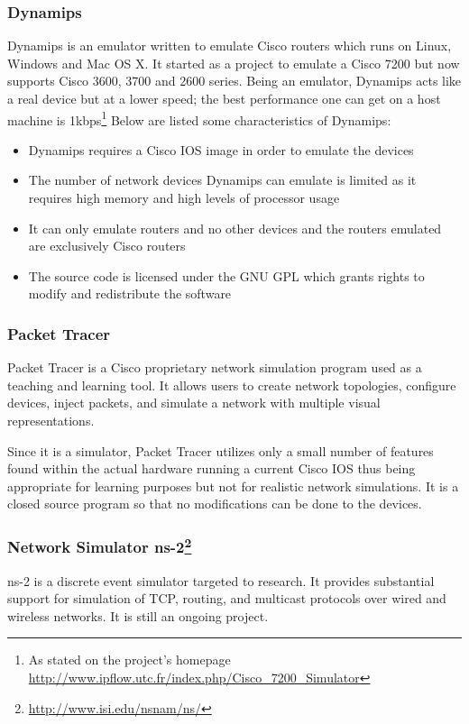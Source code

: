 \subsubsection{Dynamips}
Dynamips is an emulator written to emulate Cisco routers which runs on Linux, Windows and Mac OS X. It started as a project to emulate a Cisco 7200 but now supports  Cisco 3600, 3700 and 2600 series.
Being an emulator, Dynamips acts like a real device but at a lower speed; the best performance one can get on a host machine is 1kbps\footnote{As stated on the project's homepage \url{http://www.ipflow.utc.fr/index.php/Cisco_7200_Simulator}}
Below are listed some characteristics of Dynamips:
\begin{itemize}
\item Dynamips requires a Cisco IOS image in order to emulate the devices 
\item The number of network devices Dynamips can emulate is limited as it requires high memory and high levels of  processor usage
\item It can only emulate routers and no other devices and the routers emulated are exclusively Cisco routers
\item The source code is licensed under the GNU GPL which grants rights to modify and redistribute the software
\end{itemize}

\subsubsection{Packet Tracer}
Packet Tracer is a Cisco proprietary network simulation program used as a teaching and learning tool. It allows users to create network topologies, configure devices, inject packets, and simulate a network with multiple visual representations.

Since it is a simulator, Packet Tracer utilizes only a small number of features found within the actual hardware running a current Cisco IOS thus being appropriate for learning purposes but not for realistic network simulations.
It is a closed source program so that no modifications can be done to the devices.

\subsubsection[Network Simulator ns-2]{Network Simulator ns-2\footnote{\url{http://www.isi.edu/nsnam/ns/}}}

ns-2 is a discrete event simulator targeted to research. It provides substantial support for simulation of TCP, routing, and multicast protocols over wired and wireless networks. It is still an ongoing project.
